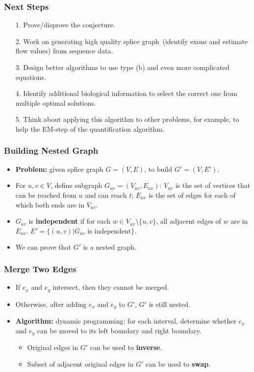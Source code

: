 \frame
{
	\frametitle{Next Steps}

	\begin{itemize}
	\item[1.] Prove/disprove the conjecture.
	\vspace{0.3cm}
	\item[2.] Work on generating high quality splice graph~(identify exons and estimate
			flow values) from sequence data.
	\vspace{0.3cm}
	\item[3.] Design better algorithms to use type (b) and even more complicated equations.
	\vspace{0.3cm}
	\item[4.] Identify additional biological information to select the correct one from 
		multiple optimal solutions.
	\vspace{0.3cm}
	\item[5.] Think about applying this algorithm to other problems, for example, to
		help the EM-step of the quantification algorithm.
	\end{itemize}
}

\frame
{
	\frametitle{Building Nested Graph}
	\vspace{-1.2cm}

	\begin{itemize}
	\item {\bf Problem:} given splice graph $G=(V,E)$, to build $G'=(V,E')$.
	\item For $u,v\in V$, define subgraph $G_{uv} = (V_{uv}, E_{uv})$:
	$V_{uv}$ is the set of vertices that can be reached from $u$ and can reach $t$; $E_{uv}$ 
	is the set of edges for each of which both ends are in $V_{uv}$.
	\item $G_{uv}$ is {\bf independent} if for each $w\in V_{uv}\setminus \{u,v\}$, all adjacent edges
	of $w$ are in $E_{uv}$.  $E' = \{(u,v) | G_{uv} \textrm{ is independent}\}$.
	\item We can prove that $G'$ is a nested graph.
	\end{itemize}
	\vspace{0.8cm}
	
}

\frame
{
	\frametitle{Merge Two Edges}

	\vspace{1.0cm}
	

	\vspace{2.0cm}
	\begin{itemize}
	\item If $e_x$ and $e_y$ intersect, then they cannot be merged.
	\item Otherwise, after adding $e_x$ and $e_y$ to $G'$, $G'$ is still nested.
	\item {\bf Algorithm:} dynamic programming: for each interval, determine
	whether $e_x$ and $e_y$ can be moved to its left boundary and right boundary.
		\begin{itemize}
		\item Original edges in $G'$ can be used to {\bf inverse}.
		\item Subset of adjacent original edges in $G'$ can be used to {\bf swap}.
		\end{itemize}
	\end{itemize}
}
